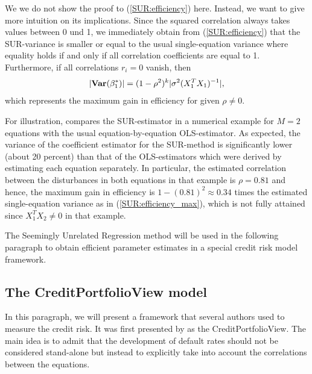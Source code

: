 \documentclass[a4paper, 12pt]{scrreprt}
\newcommand{\var}{\mbox{\textbf{Var}}}
\begin{document}
We we do not show the proof to (\ref{SUR:efficiency}) here. Instead, we want to give more intuition on its implications.
Since the squared correlation always takes values between 0 und 1, we immediately obtain from (\ref{SUR:efficiency}) that the SUR-variance is smaller or equal to the usual single-equation variance where equality holds if and only if all correlation coefficients are equal to 1. Furthermore, if all correlations $r_i = 0$ vanish, then 
\begin{equation}\label{SUR:efficiency_max}
| \var(\beta_1^*) | = (1-\rho^2)^k |\sigma^2 (X_1^T X_1)^{-1}|,
\end{equation}
which represents the maximum gain in efficiency for given $\rho \neq 0$.

For illustration, \textcite[table 1]{zellner1962efficient} compares the SUR-estimator in a numerical example for $M=2$ equations with the usual equation-by-equation OLS-estimator. As expected, the variance of the coefficient estimator for the SUR-method is significantly lower (about 20 percent) than that of the OLS-estimators which were derived by estimating each equation separately. In particular, the estimated correlation between the disturbances in both equations in that example is $\rho = 0.81$ and hence, the maximum gain in efficiency is $1-(0.81)^2 \approx 0.34$ times the estimated single-equation variance as in (\ref{SUR:efficiency_max}), which is not fully attained since $X_1^T X_2 \neq 0$ in that example.

The Seemingly Unrelated Regression method will be used in the following paragraph to obtain efficient parameter estimates in a special credit risk model framework.

\subsection{The CreditPortfolioView\texttrademark{} model}\label{par:wilson}

In this paragraph, we will present a framework that several authors used to measure the credit risk. It was first presented by \textcite{wilson1997wilsonI} as the CreditPortfolioView\texttrademark. The main idea is to admit that the development of default rates should not be \linebreak considered stand-alone but instead to explicitly take into account the correlations between the equations.
\end{document}
